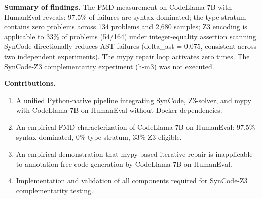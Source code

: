 \textbf{Summary of findings.} The FMD measurement on CodeLlama-7B with HumanEval reveals: 97.5\% of failures are syntax-dominated; the type stratum contains zero problems across 134 problems and 2,680 samples; Z3 encoding is applicable to 33\% of problems (54/164) under integer-equality assertion scanning. SynCode directionally reduces AST failures (delta_ast = 0.075, consistent across two independent experiments). The mypy repair loop activates zero times. The SynCode-Z3 complementarity experiment (h-m3) was not executed.

\textbf{Contributions.}

\begin{enumerate}
\item A unified Python-native pipeline integrating SynCode, Z3-solver, and mypy with CodeLlama-7B on HumanEval without Docker dependencies.
\item An empirical FMD characterization of CodeLlama-7B on HumanEval: 97.5\% syntax-dominated, 0\% type stratum, 33\% Z3-eligible.
\item An empirical demonstration that mypy-based iterative repair is inapplicable to annotation-free code generation by CodeLlama-7B on HumanEval.
\item Implementation and validation of all components required for SynCode-Z3 complementarity testing.
\end{enumerate}

